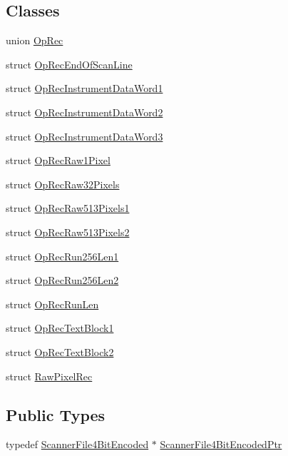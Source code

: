 \subsection*{Classes}
\begin{DoxyCompactItemize}
\item 
union \hyperlink{union_scanner_file4_bit_encoded_1_1_op_rec}{Op\+Rec}
\item 
struct \hyperlink{struct_scanner_file4_bit_encoded_1_1_op_rec_end_of_scan_line}{Op\+Rec\+End\+Of\+Scan\+Line}
\item 
struct \hyperlink{struct_scanner_file4_bit_encoded_1_1_op_rec_instrument_data_word1}{Op\+Rec\+Instrument\+Data\+Word1}
\item 
struct \hyperlink{struct_scanner_file4_bit_encoded_1_1_op_rec_instrument_data_word2}{Op\+Rec\+Instrument\+Data\+Word2}
\item 
struct \hyperlink{struct_scanner_file4_bit_encoded_1_1_op_rec_instrument_data_word3}{Op\+Rec\+Instrument\+Data\+Word3}
\item 
struct \hyperlink{struct_scanner_file4_bit_encoded_1_1_op_rec_raw1_pixel}{Op\+Rec\+Raw1\+Pixel}
\item 
struct \hyperlink{struct_scanner_file4_bit_encoded_1_1_op_rec_raw32_pixels}{Op\+Rec\+Raw32\+Pixels}
\item 
struct \hyperlink{struct_scanner_file4_bit_encoded_1_1_op_rec_raw513_pixels1}{Op\+Rec\+Raw513\+Pixels1}
\item 
struct \hyperlink{struct_scanner_file4_bit_encoded_1_1_op_rec_raw513_pixels2}{Op\+Rec\+Raw513\+Pixels2}
\item 
struct \hyperlink{struct_scanner_file4_bit_encoded_1_1_op_rec_run256_len1}{Op\+Rec\+Run256\+Len1}
\item 
struct \hyperlink{struct_scanner_file4_bit_encoded_1_1_op_rec_run256_len2}{Op\+Rec\+Run256\+Len2}
\item 
struct \hyperlink{struct_scanner_file4_bit_encoded_1_1_op_rec_run_len}{Op\+Rec\+Run\+Len}
\item 
struct \hyperlink{struct_scanner_file4_bit_encoded_1_1_op_rec_text_block1}{Op\+Rec\+Text\+Block1}
\item 
struct \hyperlink{struct_scanner_file4_bit_encoded_1_1_op_rec_text_block2}{Op\+Rec\+Text\+Block2}
\item 
struct \hyperlink{struct_scanner_file4_bit_encoded_1_1_raw_pixel_rec}{Raw\+Pixel\+Rec}
\end{DoxyCompactItemize}
\subsection*{Public Types}
\begin{DoxyCompactItemize}
\item 
typedef \hyperlink{class_k_k_l_s_c_1_1_scanner_file4_bit_encoded}{Scanner\+File4\+Bit\+Encoded} $\ast$ \hyperlink{class_k_k_l_s_c_1_1_scanner_file4_bit_encoded_a252ab577287c598a676265cd67240396}{Scanner\+File4\+Bit\+Encoded\+Ptr}
\end{DoxyCompactItemize}
